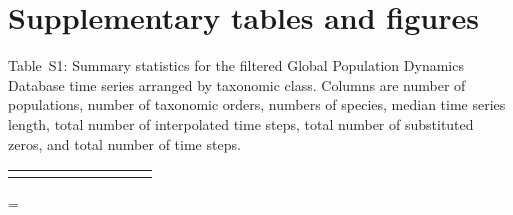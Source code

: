 \documentclass[12pt]{article}
\begin{document}
\section{Supplementary tables and figures}


\singlespacing

Table~S1: Summary statistics for the filtered Global Population
Dynamics Database time series arranged by taxonomic class. Columns are number
of populations, number of taxonomic orders, numbers of species, median time
series length, total number of interpolated time steps, total number of
substituted zeros, and total number of time steps.

\onehalfspacing

\smallskip
\begin{footnotesize}
\begin{tabular}{lrrrrrrrr}
\toprule

\label{tab:stats}
\end{tabular}
\end{footnotesize}

\clearpage

\LTcapwidth=\textwidth

\renewcommand{\thefigure}{S\arabic{figure}}
\renewcommand{\thetable}{S\arabic{table}}


\renewcommand{\tablename}{Table}

\setcounter{table}{1}

\renewcommand{\arraystretch}{0.1}%
\end{document}

